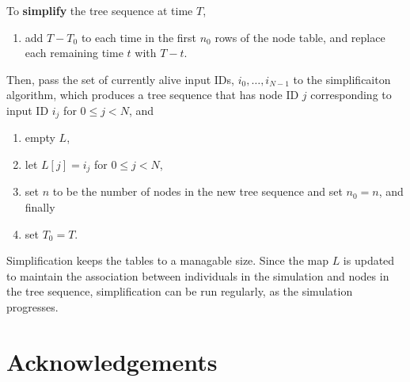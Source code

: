 \documentclass{article}
\begin{document}
To \textbf{simplify} the tree sequence at time $T$,
\begin{enumerate}
    \item add $T-T_0$ to each time in the first $n_0$ rows of the node table,
        and replace each remaining time $t$ with $T-t$.
\end{enumerate}
Then, pass the set of currently alive input IDs,
$i_0, \ldots, i_{N-1}$ to the simplificaiton algorithm,
which produces a tree sequence that has node ID $j$ corresponding to input ID $i_j$
for $0 \le j < N$, and
\begin{enumerate}[resume]
    \item empty $L$,
    \item let $L[j] = i_j$ for $0 \le j < N$,
    \item set $n$ to be the number of nodes in the new tree sequence and set $n_0 = n$, and finally
    \item set $T_0 = T$.
\end{enumerate}

Simplification keeps the tables to a managable size.
Since the map $L$ is updated to maintain the association between individuals in the simulation
and nodes in the tree sequence, simplification can be run regularly,
as the simulation progresses.

\section*{Acknowledgements}




\appendix
\end{document}
